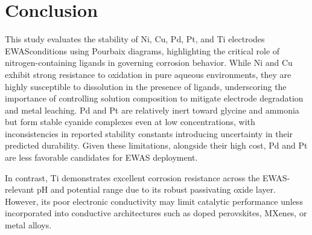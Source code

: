 \documentclass[journal=jacsat,manuscript=article]{achemso}
\begin{document}
\section{Conclusion}

This study evaluates the stability of Ni, Cu, Pd, Pt, and Ti electrodes EWASconditions using Pourbaix diagrams, highlighting the critical role of nitrogen-containing ligands in governing corrosion behavior. While Ni and Cu exhibit strong resistance to oxidation in pure aqueous environments, they are highly susceptible to dissolution in the presence of  ligands, underscoring the importance of controlling solution composition to mitigate electrode degradation and metal leaching. Pd and Pt are relatively inert toward glycine and ammonia but form stable cyanide complexes even at low concentrations, with inconsistencies in reported stability constants introducing uncertainty in their predicted durability. Given these limitations, alongside their high cost, Pd and Pt are less favorable candidates for EWAS deployment.

In contrast, Ti demonstrates excellent corrosion resistance across the EWAS-relevant pH and potential range due to its robust passivating oxide layer. However, its poor electronic conductivity may limit catalytic performance unless incorporated into conductive architectures such as doped perovskites, MXenes, or metal alloys.
\end{document}
